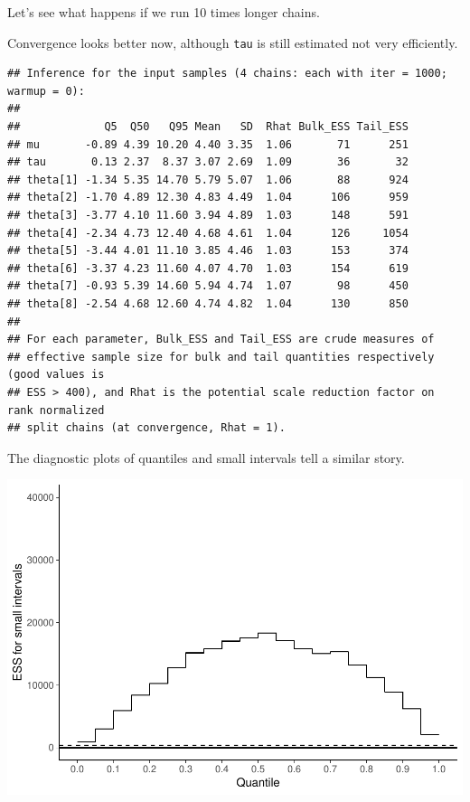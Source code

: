 \documentclass[american,]{article}
\begin{document}
Let's see what happens if we run 10 times longer chains.

Convergence looks better now, although \texttt{tau} is still estimated
not very efficiently.

\begin{verbatim}
## Inference for the input samples (4 chains: each with iter = 1000; warmup = 0):
## 
##             Q5  Q50   Q95 Mean   SD  Rhat Bulk_ESS Tail_ESS
## mu       -0.89 4.39 10.20 4.40 3.35  1.06       71      251
## tau       0.13 2.37  8.37 3.07 2.69  1.09       36       32
## theta[1] -1.34 5.35 14.70 5.79 5.07  1.06       88      924
## theta[2] -1.70 4.89 12.30 4.83 4.49  1.04      106      959
## theta[3] -3.77 4.10 11.60 3.94 4.89  1.03      148      591
## theta[4] -2.34 4.73 12.40 4.68 4.61  1.04      126     1054
## theta[5] -3.44 4.01 11.10 3.85 4.46  1.03      153      374
## theta[6] -3.37 4.23 11.60 4.07 4.70  1.03      154      619
## theta[7] -0.93 5.39 14.60 5.94 4.74  1.07       98      450
## theta[8] -2.54 4.68 12.60 4.74 4.82  1.04      130      850
## 
## For each parameter, Bulk_ESS and Tail_ESS are crude measures of 
## effective sample size for bulk and tail quantities respectively (good values is 
## ESS > 400), and Rhat is the potential scale reduction factor on rank normalized
## split chains (at convergence, Rhat = 1).
\end{verbatim}

The diagnostic plots of quantiles and small intervals tell a similar
story.

\includegraphics{graphics/local-ess-jags-cp-tau-longer-1.pdf}
\end{document}
